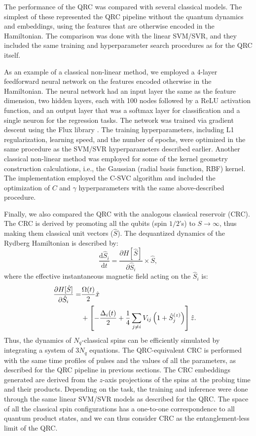 \documentclass[english,floatfix,twocolumn,showpacs, aps, prx, reprint, superscriptaddress, longbibliography]{revtex4-2}
\begin{document}
The performance of the QRC was compared with several classical models. The simplest of these represented the QRC pipeline without the quantum dynamics and embeddings, using the features that are otherwise encoded in the Hamiltonian. The comparison was done with the linear SVM/SVR, and they included the same training and hyperparameter search procedures as for the QRC itself. 

As an example of a classical non-linear method, we employed a 4-layer feedforward neural network on the features encoded otherwise in the Hamiltonian. The neural network had an input layer the same as the feature dimension, two hidden layers, each with 100 nodes followed by a ReLU activation function, and an output layer that was a softmax layer for classification and a single neuron for the regression tasks. The network was trained via gradient descent using the Flux library \cite{Flux2018}. The training hyperparameters, including L1 regularization, learning speed, and the number of epochs, were optimized in the same procedure as the SVM/SVR hyperparameters described earlier. Another classical non-linear method was employed for some of the kernel geometry construction calculations, i.e., the Gaussian (radial basis function, RBF) kernel. The implementation employed the C-SVC algorithm \cite{Libsvm2011} and included the optimization of $C$ and $\gamma$ hyperparameters with the same above-described procedure. 

Finally, we also compared the QRC with the analogous classical reservoir (CRC). The CRC is derived by promoting all the qubits (spin $1/2$'s) to $S\rightarrow\infty$, thus making them classical unit vectors ($\hat{S}$). The dequantized dynamics of the Rydberg Hamiltonian is described by:
\begin{equation}\label{eq:CRCdynamics}
    \frac{\mathrm{d} \hat{S}_i}{\mathrm{d} t}= \frac{\partial H[\hat{S}]}{\partial \hat{S}_i} \times \hat{S},
\end{equation}
where the effective instantaneous magnetic field acting on the $\hat{S}_i$ is:
\begin{align}\label{eq:CRCfield}
    \frac{\partial H[\hat{S}]}{\partial \hat{S}_i}=&\frac{\Omega(t)}{2} \hat{x}\cr&+ \left[-\frac{\Delta_i(t)}{2} + \frac{1}{4} \sum_{j\neq i}V_{ij}\left(1 + \hat{S}_j^{(z)} \right)\right] \hat{z}.
\end{align}
Thus, the dynamics of $N_q$-classical spins can be efficiently simulated by integrating a system of $3N_q$ equations. The QRC-equivalent CRC is performed with the same time profiles of pulses and the values of all the parameters, as described for the QRC pipeline in previous sections. The CRC embeddings generated are derived from the $z$-axis projections of the spins at the probing time and their products. Depending on the task, the training and inference were done through the same linear SVM/SVR models as described for the QRC. The space of all the classical spin configurations has a one-to-one correspondence to all quantum product states, and we can thus consider CRC as the entanglement-less limit of the QRC.
\end{document}
